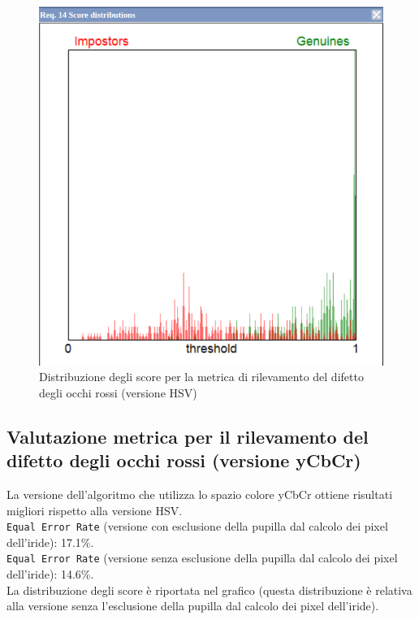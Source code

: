 \documentclass[12pt,a4paper,openright,twoside]{book}
\begin{document}
\begin{figure}
    \centering
    \includegraphics[width=.8\linewidth]{figures/score-distribution-red-eye-with-hsv.png}
    \caption{Distribuzione degli score per la metrica di rilevamento del difetto degli occhi rossi (versione HSV)}
    \label{fig:score_distribution_red_eye_with_hsv}
\end{figure}

\subsection{Valutazione metrica per il rilevamento del difetto degli occhi rossi (versione yCbCr)}
La versione dell'algoritmo che utilizza lo spazio colore yCbCr ottiene risultati migliori rispetto alla versione HSV. \\[4pt]
\texttt{Equal Error Rate} (versione con esclusione della pupilla dal calcolo dei pixel dell'iride): 17.1\%. \\
\texttt{Equal Error Rate} (versione senza esclusione della pupilla dal calcolo dei pixel dell'iride): 14.6\%. \\
La distribuzione degli score è riportata nel grafico  (questa distribuzione è relativa alla versione senza l'esclusione della pupilla dal calcolo dei pixel dell'iride).
\end{document}
